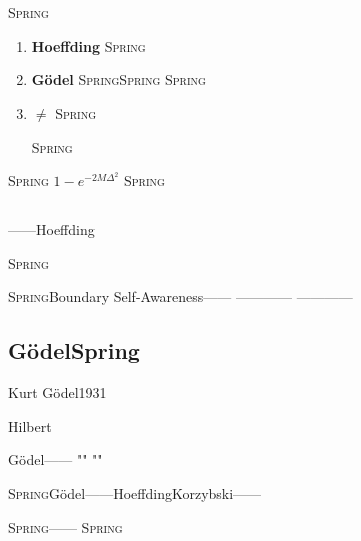 \documentclass[12pt,a4paper]{article}
\theoremstyle{remark}
\newcommand{\Spring}{\textsc{Spring}}
\begin{document}
\newpage

\section{}

\subsection{}

\Spring{}

\begin{enumerate}[label=\textbf{ \arabic*}, leftmargin=*, itemsep=6pt]
    \item \textbf{Hoeffding} 
    \Spring{}
    
    
    \item \textbf{G\"odel} 
    \Spring{}\Spring{}
    \Spring{}
    
    \item \textbf{$\neq$} \Spring{}
    
    \Spring{}
\end{enumerate}

\textbf{}
\Spring{}
$1-e^{-2M\Delta^2}$
\Spring{}

\subsection{}



\begin{center}
\boxed{\text{}}
\end{center}

——Hoeffding




\Spring{}


\Spring{}\textbf{}Boundary Self-Awareness——
\textbf{}
————
————

\subsection{G\"odelSpring}

Kurt G\"odel1931

Hilbert

G\"odel——
""
""

\Spring{}G\"odel——HoeffdingKorzybski——

\Spring{}——
\Spring{}\textbf{}\textbf{}
\end{document}
